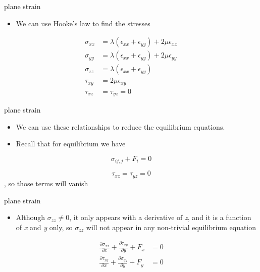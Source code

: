\documentclass[
  letterpaper,
  ignorenonframetext,
  aspectratio=43,
  handout,
  12pt]{beamer}
\providecommand{\tightlist}{%
  \setlength{\itemsep}{0pt}\setlength{\parskip}{0pt}}
\providecommand{\tightlist}{%
\setlength{\itemsep}{0pt}\setlength{\parskip}{0pt}}
\begin{document}
\begin{frame}{plane strain}
\protect\hypertarget{plane-strain-3}{}
\begin{itemize}
\tightlist
\item
  We can use Hooke's law to find the stresses
\end{itemize}

\[\begin{aligned}
    \sigma_{xx} &= \lambda(\epsilon_{xx} + \epsilon_{yy}) + 2\mu \epsilon_{xx}\\
    \sigma_{yy} &= \lambda(\epsilon_{xx} + \epsilon_{yy}) + 2\mu \epsilon_{yy}\\
    \sigma_{zz} &= \lambda(\epsilon_{xx} + \epsilon_{yy})\\
    \tau_{xy} &= 2\mu \epsilon_{xy} \\
    \tau_{xz} &= \tau_{yz} = 0
\end{aligned}\]
\end{frame}

\begin{frame}{plane strain}
\protect\hypertarget{plane-strain-4}{}
\begin{itemize}
\tightlist
\item
  We can use these relationships to reduce the equilibrium equations.
\item
  Recall that for equilibrium we have
\end{itemize}

\[\sigma_{ij,j} + F_i = 0\]

\[\tau_{xz} = \tau_{yz} = 0\], so those terms will vanish
\end{frame}

\begin{frame}{plane strain}
\protect\hypertarget{plane-strain-5}{}
\begin{itemize}
\tightlist
\item
  Although \(\sigma_{zz} \ne 0\), it only appears with a derivative of
  \emph{z}, and it is a function of \emph{x} and \emph{y} only, so
  \(\sigma_{zz}\) will not appear in any non-trivial equilibrium
  equation
\end{itemize}

\[\begin{aligned}
    \frac{\partial \sigma_{xx}}{\partial x} + \frac{\partial \tau_{xy}}{\partial y} + F_x &= 0\\
    \frac{\partial \tau_{xy}}{\partial x} +\frac{\partial \sigma_{yy}}{\partial y} +  F_y &= 0
\end{aligned}\]
\end{frame}
\end{document}
